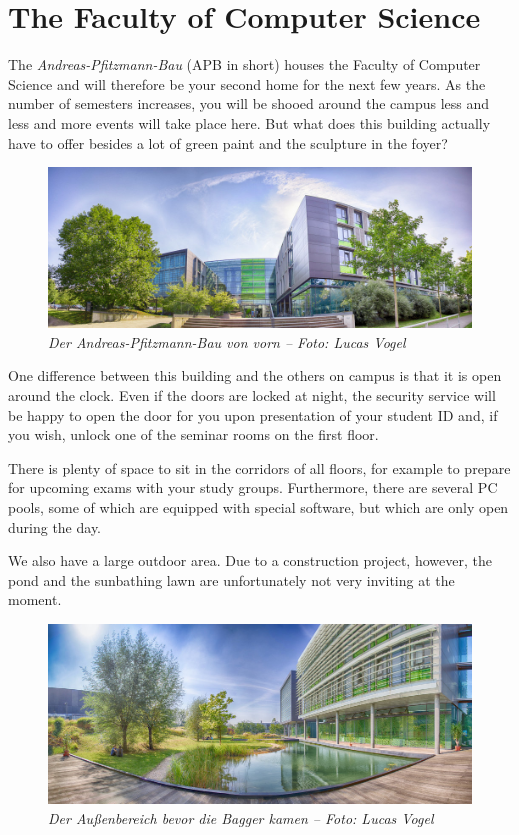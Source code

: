 \chapter{The Faculty of Computer Science}

The \emph{Andreas-Pfitzmann-Bau} (APB in short) houses the Faculty of Computer Science and will therefore be your second home for the next few years. As the number of semesters increases, you will be shooed around the campus less and less and more events will take place here. But what does this building actually have to offer besides a lot of green paint and the sculpture in the foyer?

\begin{figure}[h!]
    \centering
    \includegraphics[width=\linewidth]{img/panorama_fakultaet1.jpg}
    \caption*{\small \textit{Der Andreas-Pfitzmann-Bau von vorn -- Foto: Lucas Vogel}}
\end{figure}

One difference between this building and the others on campus is that it is open around the clock. Even if the doors are locked at night, the security service will be happy to open the door for you upon presentation of your student ID and, if you wish, unlock one of the seminar rooms on the first floor.

There is plenty of space to sit in the corridors of all floors, for example to prepare for upcoming exams with your study groups. Furthermore, there are several PC pools, some of which are equipped with special software, but which are only open during the day.

\label{sec:apb}
We also have a large outdoor area. Due to a construction project, however, the pond and the sunbathing lawn are unfortunately not very inviting at the moment.

\begin{figure}[t]
    \centering
    \includegraphics[width=\linewidth]{img/panorama_teich1.jpg}
    \caption*{\small \textit{Der Außenbereich bevor die Bagger kamen -- Foto: Lucas Vogel}}
\end{figure}

